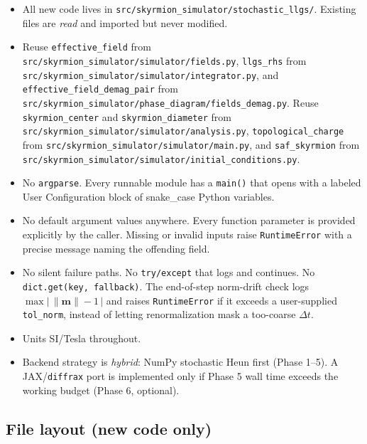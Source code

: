 \documentclass[11pt,a4paper]{article}
\newcommand{\mb}[1]{\mathbf{#1}}
\begin{document}
\begin{itemize}[leftmargin=2em]
    \item All new code lives in \texttt{src/skyrmion\_simulator/stochastic\_llgs/}.
    Existing files are \emph{read} and imported but never modified.
    \item Reuse \texttt{effective\_field} from
    \texttt{src/skyrmion\_simulator/simulator/fields.py}, \texttt{llgs\_rhs} from
    \texttt{src/skyrmion\_simulator/simulator/integrator.py}, and
    \texttt{effective\_field\_demag\_pair} from
    \texttt{src/skyrmion\_simulator/phase\_diagram/fields\_demag.py}. Reuse
    \texttt{skyrmion\_center} and \texttt{skyrmion\_diameter} from
    \texttt{src/skyrmion\_simulator/simulator/analysis.py}, \texttt{topological\_charge}
    from \texttt{src/skyrmion\_simulator/simulator/main.py}, and \texttt{saf\_skyrmion}
    from \texttt{src/skyrmion\_simulator/simulator/initial\_conditions.py}.
    \item No \texttt{argparse}. Every runnable module has a
    \texttt{main()} that opens with a labeled User Configuration
    block of snake\_case Python variables.
    \item No default argument values anywhere. Every function
    parameter is provided explicitly by the caller. Missing or
    invalid inputs raise \texttt{RuntimeError} with a precise message
    naming the offending field.
    \item No silent failure paths. No \texttt{try/except} that logs
    and continues. No \texttt{dict.get(key, fallback)}. The
    end-of-step norm-drift check logs
    $\max\big|\,\|\mb{m}\| - 1\,\big|$ and raises
    \texttt{RuntimeError} if it exceeds a user-supplied
    \texttt{tol\_norm}, instead of letting renormalization mask a
    too-coarse $\Delta t$.
    \item Units SI/Tesla throughout.
    \item Backend strategy is \emph{hybrid}: NumPy stochastic Heun
    first (Phase 1--5). A JAX/\texttt{diffrax} port is implemented
    only if Phase 5 wall time exceeds the working budget (Phase 6,
    optional).
\end{itemize}

\subsection{File layout (new code only)}
\end{document}

